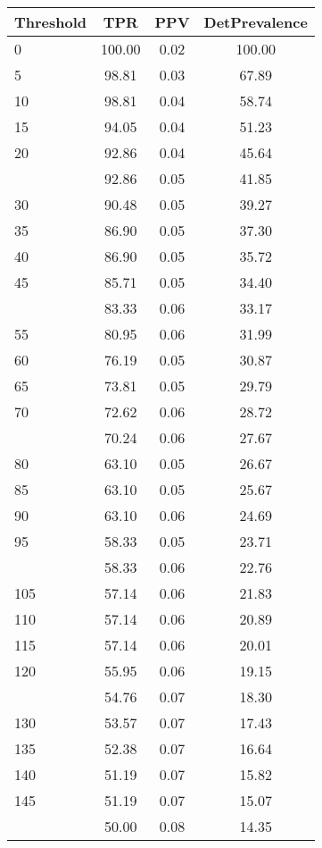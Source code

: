\begin{table}[ht]
\centering
\begin{tabular}{lccc}
  \toprule
Threshold & TPR & PPV & DetPrevalence \\ 
  \midrule
0 & 100.00 & 0.02 & 100.00 \\ 
  5 & 98.81 & 0.03 & 67.89 \\ 
  10 & 98.81 & 0.04 & 58.74 \\ 
  15 & 94.05 & 0.04 & 51.23 \\ 
  20 & 92.86 & 0.04 & 45.64 \\ 
   \addlinespace
25 & 92.86 & 0.05 & 41.85 \\ 
  30 & 90.48 & 0.05 & 39.27 \\ 
  35 & 86.90 & 0.05 & 37.30 \\ 
  40 & 86.90 & 0.05 & 35.72 \\ 
  45 & 85.71 & 0.05 & 34.40 \\ 
   \addlinespace
50 & 83.33 & 0.06 & 33.17 \\ 
  55 & 80.95 & 0.06 & 31.99 \\ 
  60 & 76.19 & 0.05 & 30.87 \\ 
  65 & 73.81 & 0.05 & 29.79 \\ 
  70 & 72.62 & 0.06 & 28.72 \\ 
   \addlinespace
75 & 70.24 & 0.06 & 27.67 \\ 
  80 & 63.10 & 0.05 & 26.67 \\ 
  85 & 63.10 & 0.05 & 25.67 \\ 
  90 & 63.10 & 0.06 & 24.69 \\ 
  95 & 58.33 & 0.05 & 23.71 \\ 
   \addlinespace
100 & 58.33 & 0.06 & 22.76 \\ 
  105 & 57.14 & 0.06 & 21.83 \\ 
  110 & 57.14 & 0.06 & 20.89 \\ 
  115 & 57.14 & 0.06 & 20.01 \\ 
  120 & 55.95 & 0.06 & 19.15 \\ 
   \addlinespace
125 & 54.76 & 0.07 & 18.30 \\ 
  130 & 53.57 & 0.07 & 17.43 \\ 
  135 & 52.38 & 0.07 & 16.64 \\ 
  140 & 51.19 & 0.07 & 15.82 \\ 
  145 & 51.19 & 0.07 & 15.07 \\ 
   \addlinespace
150 & 50.00 & 0.08 & 14.35 \\ 

\end{tabular}
\end{table}
